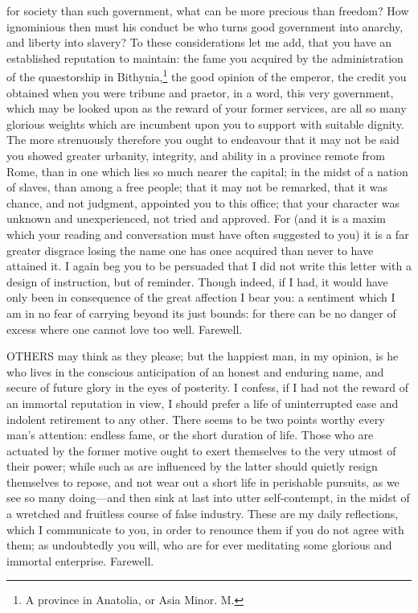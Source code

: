 for society than such government, what can be more precious than freedom?
How ignominious then must his conduct be who turns good government into
anarchy, and liberty into slavery? To these considerations let me add,
that you have an established reputation to maintain: the fame you acquired
by the administration of the quaestorship in Bithynia,\footnote{A province in Anatolia,
or Asia Minor. M.}
the good opinion of the emperor, the credit you obtained when you were
tribune and praetor, in a word, this very government, which may be looked
upon as the reward of your former services, are all so many glorious
weights which are incumbent upon you to support with suitable dignity. The
more strenuously therefore you ought to endeavour that it may not be said
you showed greater urbanity, integrity, and ability in a province remote
from Rome, than in one which lies so much nearer the capital; in the midst
of a nation of slaves, than among a free people; that it may not be
remarked, that it was chance, and not judgment, appointed you to this
office; that your character was unknown and unexperienced, not tried and
approved. For (and it is a maxim which your reading and conversation must
have often suggested to you) it is a far greater disgrace losing the name
one has once acquired than never to have attained it. I again beg you to
be persuaded that I did not write this letter with a design of
instruction, but of reminder. Though indeed, if I had, it would have only
been in consequence of the great affection I bear you: a sentiment which I
am in no fear of carrying beyond its just bounds: for there can be no
danger of excess where one cannot love too well. Farewell.


OTHERS may think as they please; but the happiest man, in my opinion, is
he who lives in the conscious anticipation of an honest and enduring name,
and secure of future glory in the eyes of posterity. I confess, if I had
not the reward of an immortal reputation in view, I should prefer a life
of uninterrupted ease and indolent retirement to any other. There seems to
be two points worthy every man's attention: endless fame, or the short
duration of life. Those who are actuated by the former motive ought to
exert themselves to the very utmost of their power; while such as are
influenced by the latter should quietly resign themselves to repose, and
not wear out a short life in perishable pursuits, as we see so many doing—and
then sink at last into utter self-contempt, in the midst of a wretched and
fruitless course of false industry. These are my daily reflections, which
I communicate to you, in order to renounce them if you do not agree with
them; as undoubtedly you will, who are for ever meditating some glorious
and immortal enterprise. Farewell.

